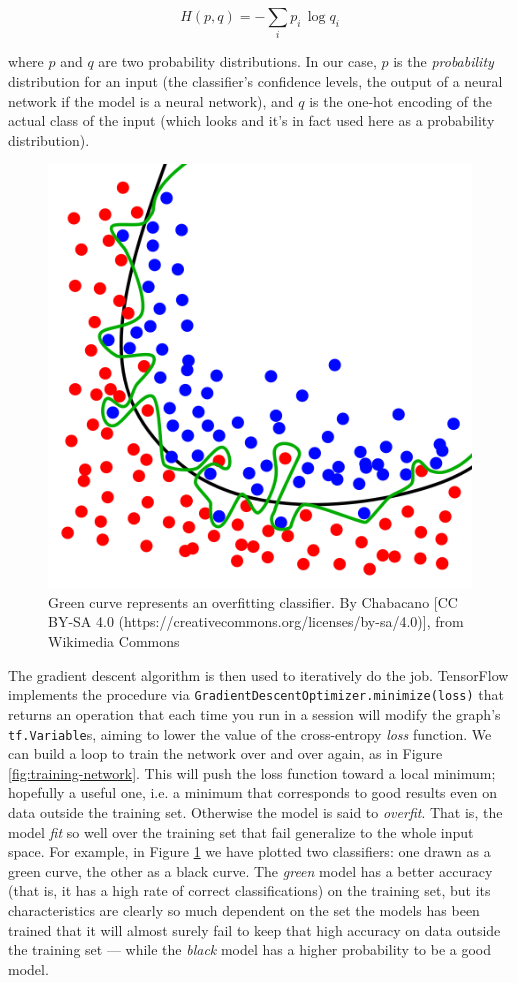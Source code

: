 \[ H(p, q) = - \sum_i {p_i \, \log{q_i}} \]

where $p$ and $q$ are two probability distributions. In our case, $p$
is the \emph{probability} distribution for an input (the classifier's
confidence levels, the output of a neural network if the model is a
neural network), and $q$ is the one-hot encoding of the actual class of
the input (which looks and it's in fact used here as a probability
distribution).

\begin{figure}
  \centering
  \includegraphics[width=0.5\linewidth]{wikipedia-overfitting.png}
  \caption{Green curve represents an overfitting classifier. By
    Chabacano [CC BY-SA 4.0
      (https://creativecommons.org/licenses/by-sa/4.0)], from Wikimedia
    Commons}
  \label{fig:wikipedia-overfitting}
\end{figure}

The gradient descent algorithm is then used to iteratively do the job.
TensorFlow implements the procedure via
\texttt{GradientDescentOptimizer.minimize(loss)} that returns an
operation that each time you run in a session will modify the graph's
\texttt{tf.Variable}s, aiming to lower the value of the cross-entropy
\emph{loss} function. We can build a loop to train the network over and
over again, as in Figure \ref{fig:training-network}. This will push the
loss function toward a local minimum; hopefully a useful one, i.e. a
minimum that corresponds to good results even on data outside the
training set. Otherwise the model is said to \emph{overfit}. That is,
the model \emph{fit} so well over the training set that fail generalize
to the whole input space. For example, in Figure
\ref{fig:wikipedia-overfitting} we have plotted two classifiers: one
drawn as a green curve, the other as a black curve. The \emph{green}
model has a better accuracy (that is, it has a high rate of correct
classifications) on the training set, but its characteristics are
clearly so much dependent on the set the models has been trained that
it will almost surely fail to keep that high accuracy on data outside
the training set --- while the \emph{black} model has a higher
probability to be a good model.

